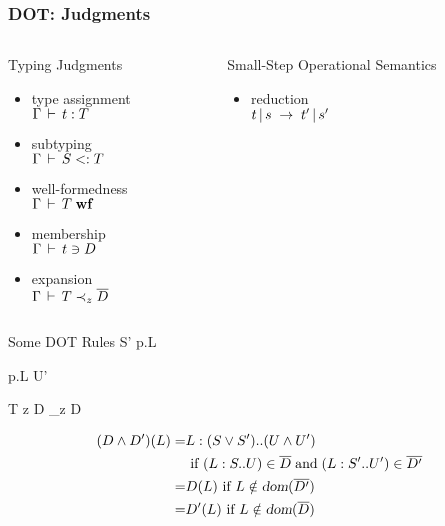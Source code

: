 \documentclass{beamer}
\begin{document}
\begin{frame}[fragile]
\frametitle{DOT: Judgments}
\begin{columns}
\begin{column}[t]{5cm}
\begin{block}{Typing Judgments}
\begin{itemize}
\item type assignment\\$\Gamma \,\vdash\, t : T$
\item subtyping\\$\Gamma \,\vdash\, S <: T$
\item well-formedness\\$\Gamma \,\vdash\, T \;\mbox{\textbf{wf}}$
\item membership\\$\Gamma \,\vdash\, t \ni D$
\item expansion\\$\Gamma \,\vdash\, T \prec_z \overline{D}$
\end{itemize}
\end{block}
\end{column}
\begin{column}[t]{5cm}
\begin{block}{Small-Step Operational Semantics}
\begin{itemize}
\item reduction\\$t \operatorname{|} s \;\rightarrow\; t' \operatorname{|} s'$
\end{itemize}
\end{block}
\end{column}
\end{columns}
\end{frame}

\begin{frame}[fragile]{Some DOT Rules}
      {\Gamma \ts S' \sub p.L}

      {\Gamma \ts p.L \sub U'}

      {\Gamma \ts T  z {\seq D} \expand_z  \tand \seq D}

      \begin{align*}
      (D \wedge D')(L) =&
        L : (S \vee S')..(U \wedge U') \\& \ \mbox{if~} (L : S..U) \in \overline{D} \;\mbox{and}\; (L : S'..U') \in \overline{D'} \\
        =& D(L) \ \mbox{if~} L \notin \mbox{\sl dom}(\overline{D'}) \\
        =& D'(L) \ \mbox{if~} L \notin \mbox{\sl dom}(\overline{D}) \\
      \end{align*}
\end{frame}
\end{document}

